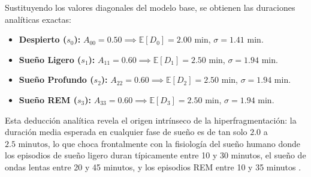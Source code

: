 \documentclass[11pt,a4paper]{article}
\begin{document}
Sustituyendo los valores diagonales del modelo base, se obtienen las duraciones analíticas exactas:
\begin{itemize}[leftmargin=*,itemsep=1pt]
    \item \textbf{Despierto ($s_0$):} $A_{00} = 0.50 \implies \mathbb{E}[D_0] = 2.00\text{ min}$, $\sigma = 1.41\text{ min}$.
    \item \textbf{Sueño Ligero ($s_1$):} $A_{11} = 0.60 \implies \mathbb{E}[D_1] = 2.50\text{ min}$, $\sigma = 1.94\text{ min}$.
    \item \textbf{Sueño Profundo ($s_2$):} $A_{22} = 0.60 \implies \mathbb{E}[D_2] = 2.50\text{ min}$, $\sigma = 1.94\text{ min}$.
    \item \textbf{Sueño REM ($s_3$):} $A_{33} = 0.60 \implies \mathbb{E}[D_3] = 2.50\text{ min}$, $\sigma = 1.94\text{ min}$.
\end{itemize}

Esta deducción analítica revela el origen intrínseco de la hiperfragmentación: la duración media esperada en cualquier fase de sueño es de tan solo $2.0$ a $2.5\text{ minutos}$, lo que choca frontalmente con la fisiología del sueño humano donde los episodios de sueño ligero duran típicamente entre 10 y 30 minutos, el sueño de ondas lentas entre 20 y 45 minutos, y los episodios REM entre 10 y 35 minutos \cite{carska2011, aasm2020}.
\end{document}
